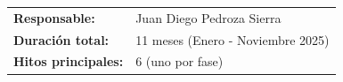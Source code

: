 \documentclass[landscape,a4paper]{article}
\begin{document}
\vspace{1cm}

\begin{tabular}{ll}
\textbf{Responsable:} & Juan Diego Pedroza Sierra \\
\textbf{Duración total:} & 11 meses (Enero - Noviembre 2025) \\
\textbf{Hitos principales:} & 6 (uno por fase) \\
\end{tabular}
\end{document}
